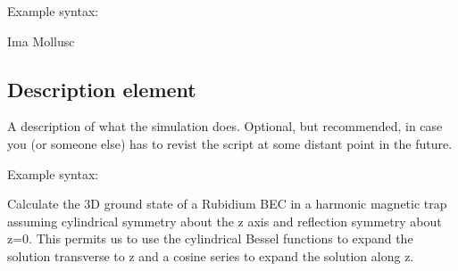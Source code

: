 \documentclass[letterpaper,10pt,english]{sphinxmanual}
\begin{document}
\sphinxAtStartPar
Example syntax:

\begin{sphinxVerbatim}[commandchars=\\\{\}]
 Ima Mollusc 
\end{sphinxVerbatim}

\ignorespaces 

\subsection{Description element}
\label{\detokenize{reference_elements:description-element}}\label{\detokenize{reference_elements:descriptionelement}}\label{\detokenize{reference_elements:index-4}}
\sphinxAtStartPar
A description of what the simulation does. Optional, but recommended, in case you (or someone else) has to revist the script at some distant point in the future.

\sphinxAtStartPar
Example syntax:

\begin{sphinxVerbatim}[commandchars=\\\{\}]
  Calculate the 3D ground state of a Rubidium BEC in a harmonic magnetic trap assuming
  cylindrical symmetry about the z axis and reflection symmetry about z=0.
  This permits us to use the cylindrical Bessel functions to expand the solution transverse
  to z and a cosine series to expand the solution along z.
\end{sphinxVerbatim}

\ignorespaces 
\end{document}
